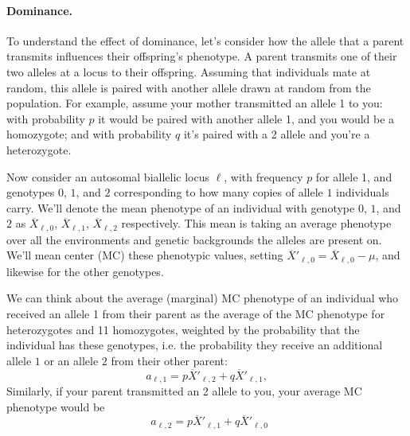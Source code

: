 
\paragraph{Dominance.} To understand the effect of dominance, let's consider how the allele
that a parent transmits influences their offspring's
phenotype. A parent transmits one of their two alleles at a locus to their offspring. 
Assuming that individuals mate at random, this allele is paired with another allele drawn at random from the population.
For example, assume your mother transmitted an allele 1 to you: with probability $p$ it would be paired with another allele 1, and you would be a homozygote; and with probability $q$ it's paired with a 2 allele and you're a heterozygote.


Now consider an autosomal biallelic locus $\ell$, with frequency $p$ for allele 1, and
genotypes $0$, $1$, and $2$ corresponding to how many copies of allele
$1$ individuals carry. We'll denote the mean phenotype of an individual
with genotype $0$, $1$, and $2$ as $\overline{X}_{\ell,0}$,
$\overline{X}_{\ell,1}$, $\overline{X}_{\ell,2}$ respectively. This mean is
taking an average phenotype over all the environments and genetic backgrounds the alleles
are present on. We'll mean center (MC)
these phenotypic values, setting $\overline{X}'_{\ell,0} = \overline{X}_{\ell,0} - \mu$, and
likewise for the other genotypes. 

We can think about the average
(marginal) MC
phenotype of an individual who received an allele 1 from their parent as the average of the MC phenotype for heterozygotes and 11 homozygotes, weighted by the probability that
the individual has these genotypes, i.e. the probability they receive an additional allele $1$ or an allele $2$ from their other parent:
\begin{equation} 
  a_{\ell, 1} = p\overline{X}'_{\ell,2}  + q\overline{X}'_{\ell,1}, \label{eqn:add_effect1}
\end{equation}
Similarly, if your parent transmitted an 2 allele to you, your average
MC phenotype would be
\begin{equation}
  ~~ a_{\ell, 2} = p\overline{X}'_{\ell,1}  + q\overline{X}'_{\ell,0} \label{eqn:add_effect2}
\end{equation}


